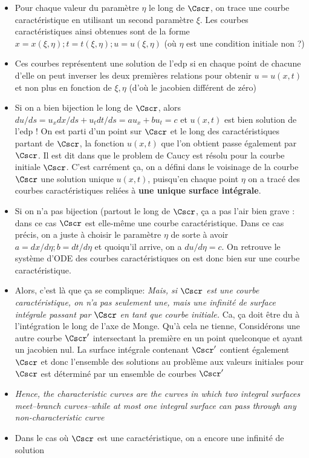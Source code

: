 \begin{itemize}
\item Pour chaque valeur du paramètre $\eta$ le long de $\Cscr$, on trace une courbe caractéristique en utilisant un second paramètre $\xi$. Les courbes caractéristiques ainsi obtenues sont de la forme $x=x(\xi,\eta) ; t=t(\xi,\eta) ; u=u(\xi,\eta)$ (où $\eta$ est une condition initiale non ?)
\item Ces courbes représentent une solution de l'edp si en chaque point de chacune d'elle on peut inverser les deux premières relations pour obtenir $u=u(x,t)$ et non plus en fonction de $\xi,\eta$ (d'où le jacobien différent de zéro)
\item Si on a bien bijection le long de $\Cscr$, alors $du/ds=u_x dx/ds + u_t dt/ds = a u_x + bu_t = c$ et $u(x,t)$ est bien solution de l'edp ! On est parti d'un point sur $\Cscr$ et le long des caractéristiques partant de $\Cscr$, la fonction $u(x,t)$ que l'on obtient passe également par $\Cscr$. Il est dit dans \cite{Courant} que le problem de Caucy est résolu pour la courbe initiale $\Cscr$. C'est carrément ça, on a défini dans le voisinage de la courbe $\Cscr$ une solution unique $u(x,t)$, puisqu'en chaque point $\eta$ on a tracé des courbes caractéristiques reliées à \textbf{une unique surface intégrale}.
\item Si on n'a pas bijection (partout le long de $\Cscr$, ça a pas l'air bien grave : dans ce cas $\Cscr$ est elle-même une courbe caractéristique. Dans ce cas précis, on a juste à choisir le paramètre $\eta$ de sorte à avoir $a=dx/d\eta ; b=dt/d\eta$ et quoiqu'il arrive, on a $du/d\eta=c$. On retrouve le système d'ODE des courbes caractéristiques on est donc bien sur une courbe caractéristique.
\item Alors, c'est là que ça se complique: \textit{Mais, si $\Cscr$ est une courbe caractéristique, on n'a pas seulement une, mais une infinité de surface intégrale passant par $\Cscr$ en tant que courbe initiale.} Ca, ça doit être du à l'intégration le long de l'axe de Monge. Qu'à cela ne tienne, Considérons une autre courbe $\Cscr'$ intersectant la première en un point quelconque et ayant un jacobien nul. La surface intégrale contenant $\Cscr'$ contient également $\Cscr$ et donc l'ensemble des solutions au problème aux valeurs initiales pour $\Cscr$ est déterminé par un ensemble de courbes $\Cscr'$
\item \textit{Hence, the characteristic curves are the curves in which two integral surfaces meet--branch curves--while at most one integral surface can pass through any non-characteristic curve}
\item Dans le cas où $\Cscr$ est une caractéristique, on a encore une infinité de solution
\end{itemize}

